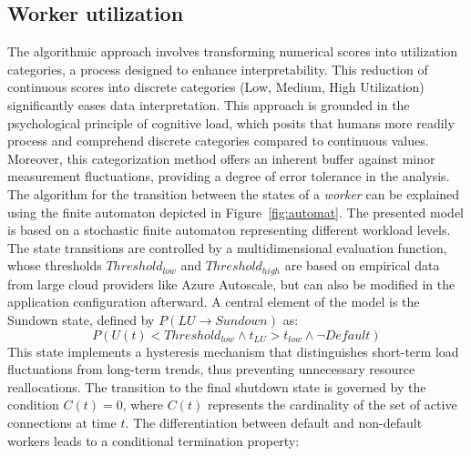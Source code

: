 \documentclass[twocolumn]{webofc}
\begin{document}
    \subsection{Worker utilization}
    The algorithmic approach involves transforming numerical scores into utilization categories, a process designed to enhance interpretability. This reduction of continuous scores into discrete categories (Low, Medium, High Utilization) significantly eases data interpretation. This approach is grounded in the psychological principle of cognitive load, which posits that humans more readily process and comprehend discrete categories compared to continuous values\cite{chen2016robust}. Moreover, this categorization method offers an inherent buffer against minor measurement fluctuations, providing a degree of error tolerance in the analysis. The algorithm for the transition between the states of a \textit{worker} can be explained using the finite automaton depicted in Figure~\ref{fig:automat}. The presented model is based on a stochastic finite automaton representing different workload levels. The state transitions are controlled by a multidimensional evaluation function, whose thresholds $Threshold_{low}$ and $Threshold_{high}$ are based on empirical data from large cloud providers like Azure Autoscale\cite{azure_autoscale_best_practices}, but can also be modified in the application configuration afterward. A central element of the model is the Sundown state, defined by \( P(LU \rightarrow Sundown) \) as:
    $$P(U(t) < Threshold_{low} \wedge t_{LU} > t_{low} \wedge \neg Default) $$
    This state implements a hysteresis mechanism that distinguishes short-term load fluctuations from long-term trends, thus preventing unnecessary resource reallocations. The transition to the final shutdown state is governed by the condition $C(t) = 0$, where $C(t)$ represents the cardinality of the set of active connections at time $t$. The differentiation between default and non-default workers leads to a conditional termination property:
\end{document}

